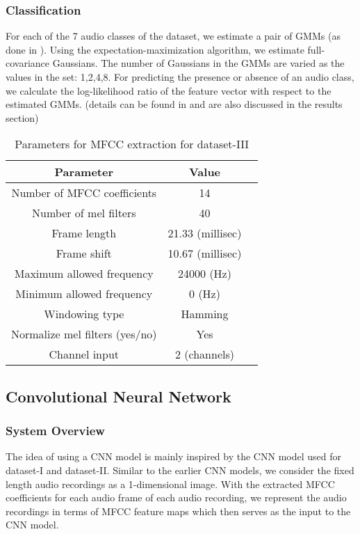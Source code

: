 \subsubsection{Classification}
For each of the 7 audio classes of the dataset, we estimate a pair of GMMs (as done in \cite{foster2015chime}). Using the expectation-maximization algorithm, we estimate full-covariance Gaussians. The number of Gaussians in the GMMs are varied as the values in the set: {1,2,4,8}. For predicting the presence or absence of an audio class, we calculate the log-likelihood ratio of the feature vector with respect to the estimated GMMs. (details can be found in \cite{foster2015chime} and are also discussed in the results section)

\begin{table}[tb]
\caption[Parameters for MFCC extraction for dataset-III]{Parameters for MFCC extraction for dataset-III}
\label{tab:param_mfcc_db3}
\centering
\begin{tabular}{ccc}
\toprule
Parameter & Value \\
\midrule
Number of MFCC coefficients	& 14\\
Number of mel filters	& 40\\
Frame length & 21.33 (millisec)\\
Frame shift 	& 10.67 (millisec)\\
Maximum allowed frequency & 24000 (Hz)\\
Minimum allowed frequency & 0 (Hz)\\
Windowing type & Hamming\\
Normalize mel filters (yes/no) & Yes \\
Channel input & 2 (channels) \\
\bottomrule 
\end{tabular}
\end{table}

\subsection{Convolutional Neural Network}

\subsubsection{System Overview}
The idea of using a CNN model is mainly inspired by the CNN model used for dataset-I and dataset-II. Similar to the earlier CNN models, we consider the fixed length audio recordings as a 1-dimensional image. With the extracted MFCC coefficients for each audio frame of each audio recording, we represent the audio recordings in terms of MFCC feature maps which then serves as the input to the CNN model.

